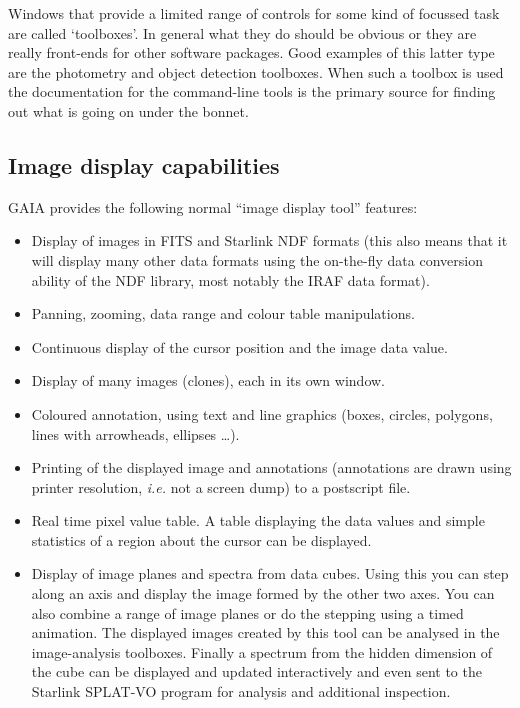\documentclass[twoside,11pt]{article}
\newcommand{\xref}[3]{#1}
\newcommand{\xlabel}[1]{}
\renewcommand{\_}{\texttt{\symbol{95}}}
\begin{document}
Windows that provide a limited range of controls for some kind of
focussed task are called `toolboxes'. In general what they do should
be obvious or they are really front-ends for other software
packages. Good examples of this latter type are the photometry and
object detection toolboxes. When such a toolbox is used the
documentation for the command-line tools is the primary source for
finding out what is going on under the bonnet.

\subsection{\xlabel{image_display_capabilities}Image display capabilities}
GAIA provides the following normal ``image display tool'' features:
\begin{itemize}
\item Display of images in FITS and Starlink \xref{NDF}{sun33}{}
  formats (this also means that it will display many other data formats
  using the on-the-fly data conversion ability of the NDF library, most
  notably the IRAF data format).

\item Panning, zooming, data range and colour table manipulations.

\item Continuous display of the cursor position and the image data
  value.

\item Display of many images (clones), each in its own window.

\item Coloured annotation, using text and line graphics (boxes,
  circles, polygons, lines with arrowheads, ellipses \ldots).

\item Printing of the displayed image and annotations (annotations
  are drawn using printer resolution, \textit{i.e.} not a screen dump)
  to a postscript file.

\item Real time pixel value table. A table displaying the data
  values and simple statistics of a region about the cursor can be
  displayed.

\item Display of image planes and spectra from data cubes. Using this you can
  step along an axis and display the image formed by the other two axes.
  You can also combine a range of image planes or do the stepping
  using a timed animation. The displayed images created by this tool can be
  analysed in the image-analysis toolboxes. Finally a spectrum from the
  hidden dimension of the cube can be displayed and updated interactively and
  even sent to the Starlink SPLAT-VO program for analysis and additional
  inspection.
\end{itemize}
\end{document}
